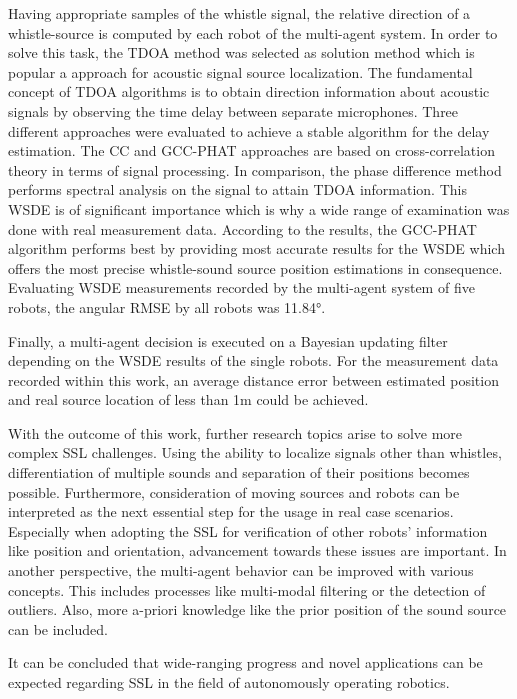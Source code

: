 Having appropriate samples of the whistle signal, the relative direction of a whistle-source
is computed by each robot of the multi-agent system.
In order to solve this task, the \acf{TDOA} method was selected as solution method
which is popular a approach for acoustic signal source localization.
The fundamental concept of \ac{TDOA} algorithms is to obtain direction information
about acoustic signals by observing the time delay between separate microphones.
Three different approaches were evaluated to achieve a stable algorithm for the delay estimation.
The \acf{CC} and \acf{GCC-PHAT} approaches are based on cross-correlation theory in terms
of signal processing.
In comparison, the phase difference method performs spectral analysis on the signal
to attain \ac{TDOA} information.
This \acf{WSDE} is of significant importance which is why a wide range of examination
was done with real measurement data.
According to the results, the \acf{GCC-PHAT} algorithm performs best by
providing most accurate results for the \ac{WSDE} which offers the most precise
whistle-sound source position estimations in consequence.
Evaluating \ac{WSDE} measurements recorded by the multi-agent system of five robots,
the angular \ac{RMSE} by all robots was 11.84\si{\degree}.

Finally, a multi-agent decision is executed on a Bayesian updating filter
depending on the \ac{WSDE} results of the single robots.
For the measurement data recorded within this work, an average
distance error between estimated position and real source location
of less than 1\si{\meter} could be achieved.

With the outcome of this work, further research topics arise to solve
more complex \ac{SSL} challenges.
Using the ability to localize signals other than whistles,
differentiation of multiple sounds and separation of their positions becomes possible.
Furthermore, consideration of moving sources and robots can be interpreted
as the next essential step for the usage in real case scenarios.
Especially when adopting the \ac{SSL} for verification of other robots' information
like position and orientation, advancement towards these issues are
important.
In another perspective, the multi-agent behavior can be improved with various
concepts.
This includes processes like multi-modal filtering or the detection of outliers.
Also, more a-priori knowledge like the prior position of the sound source can be included.

It can be concluded that wide-ranging progress and novel applications can be expected
regarding \ac{SSL} in the field of autonomously operating robotics.

